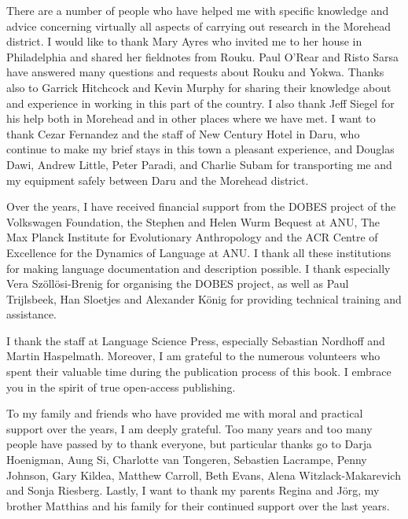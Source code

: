 There are a number of people who have helped me with specific knowledge and advice concerning virtually all aspects of carrying out research in the Morehead district. I would like to thank Mary Ayres who invited me to her house in Philadelphia and shared her fieldnotes from Rouku. Paul O'Rear and Risto Sarsa have answered many questions and requests about Rouku and Yokwa. Thanks also to Garrick Hitchcock and Kevin Murphy for sharing their knowledge about and experience in working in this part of the country. I also thank Jeff Siegel for his help both in Morehead and in other places where we have met. I want to thank Cezar Fernandez and the staff of New Century Hotel in Daru, who continue to make my brief stays in this town a pleasant experience, and Douglas Dawi, Andrew Little, Peter Paradi, and Charlie Subam for transporting me and my equipment safely between Daru and the Morehead district.

Over the years, I have received financial support from the DOBES project of the Volkswagen Foundation, the Stephen and Helen Wurm Bequest at ANU, The Max Planck Institute for Evolutionary Anthropology and the ACR Centre of Excellence for the Dynamics of Language at ANU. I thank all these institutions for making language documentation and description possible. I thank especially Vera Szöllösi-Brenig for organising the DOBES project, as well as Paul Trijlsbeek, Han Sloetjes and Alexander König for providing technical training and assistance.

I thank the staff at Language Science Press, especially Sebastian Nordhoff and Martin Haspelmath. Moreover, I am grateful to the numerous volunteers who spent their valuable time during the publication process of this book. I embrace you in the spirit of true open-access publishing.

To my family and friends who have provided me with moral and practical support over the years, I am deeply grateful. Too many years and too many people have passed by to thank everyone, but particular thanks go to Darja Hoenigman, Aung Si, Charlotte van Tongeren, Sebastien Lacrampe, Penny Johnson, Gary Kildea, Matthew Carroll, Beth Evans, Alena Witzlack-Makarevich and Sonja Riesberg. Lastly, I want to thank my parents Regina and Jörg, my brother Matthias and his family for their continued support over the last years.